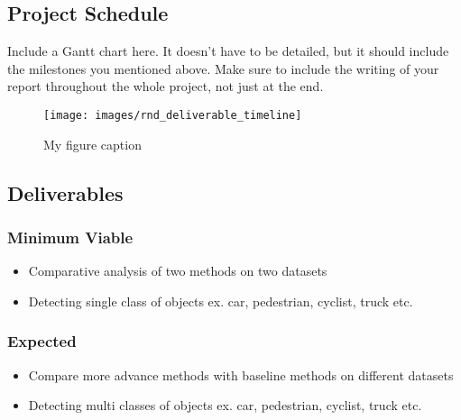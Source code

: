 \documentclass[rnd]{mas_proposal}
\begin{document}
\subsection{Project Schedule}
Include a Gantt chart here. It doesn't have to be detailed, but it should include the milestones you mentioned above.
Make sure to include the writing of your report throughout the whole project, not just at the end.

\begin{figure}[h!]
    \texttt{[image: images/rnd\_deliverable\_timeline]}
    \caption{My figure caption}
    \label{fig:myfigure}
\end{figure}

\subsection{Deliverables}

\subsubsection*{Minimum Viable}
\begin{itemize}
    \item Comparative analysis of two methods on two datasets
    \item Detecting single class of objects ex. car, pedestrian, cyclist, truck etc.

\end{itemize}

\subsubsection*{Expected}
\begin{itemize}
    \item Compare more advance methods with baseline methods on different datasets
    \item Detecting multi classes of objects ex. car, pedestrian, cyclist, truck etc.
\end{itemize}
\end{document}
